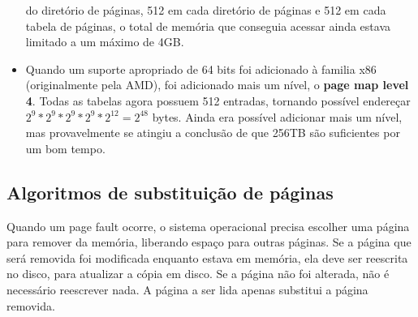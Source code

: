 \documentclass[10pt]{article}
\begin{document}
\begin{itemize}
        do diretório de páginas, 512 em cada diretório de páginas e 512 em 
        cada tabela de páginas, o total de memória que conseguia acessar ainda 
        estava limitado a um máximo de 4GB. 
    \item Quando um suporte apropriado de 64 bits foi adicionado à familia
        x86 (originalmente pela AMD), foi adicionado mais um nível, o 
        \textbf{page map level 4}. Todas as tabelas agora possuem 512 entradas,
        tornando possível endereçar 
        \begin{math}2^9 * 2^9 * 2^9 * 2^9 * 2^{12} = 2^{48}\end{math} bytes.
        Ainda era possível adicionar mais um nível, mas provavelmente se atingiu
        a conclusão de que 256TB são suficientes por um bom tempo.
\end{itemize}

\subsection{Algoritmos de substituição de páginas}
    \par \indent Quando um page fault ocorre, o sistema operacional precisa escolher uma
        página para remover da memória, liberando espaço para outras páginas.
        Se a página que será removida foi modificada enquanto estava em memória,
        ela deve ser reescrita no disco, para atualizar a cópia em disco. Se a página
        não foi alterada, não é necessário reescrever nada. A página a ser lida apenas
        substitui a página removida.
\end{document}
